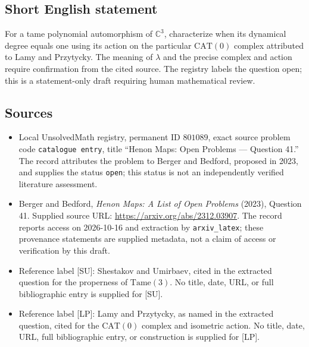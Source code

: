 \documentclass[11pt]{article}
\newcommand{\C}{\mathbb{C}}
\begin{document}
\subsection{Short English statement}
For a tame polynomial automorphism of \(\C^3\), characterize when its dynamical degree equals one using its action on the particular \(\mathrm{CAT}(0)\) complex attributed to Lamy and Przytycky. The meaning of \(\lambda\) and the precise complex and action require confirmation from the cited source. The registry labels the question open; this is a statement-only draft requiring human mathematical review.
\subsection{Sources}
\begin{itemize}
\item Local UnsolvedMath registry, permanent ID \(801089\), exact source problem code \texttt{catalogue entry}, title ``Henon Maps: Open Problems --- Question 41.'' The record attributes the problem to Berger and Bedford, proposed in 2023, and supplies the status \texttt{open}; this status is not an independently verified literature assessment.
\item Berger and Bedford, \emph{Henon Maps: A List of Open Problems} (2023), Question 41. Supplied source URL: \url{https://arxiv.org/abs/2312.03907}. The record reports access on 2026-10-16 and extraction by \texttt{arxiv\_latex}; these provenance statements are supplied metadata, not a claim of access or verification by this draft.
\item Reference label [SU]: Shestakov and Umirbaev, cited in the extracted question for the properness of \(\mathrm{Tame}(3)\). No title, date, URL, or full bibliographic entry is supplied for [SU].
\item Reference label [LP]: Lamy and Przytycky, as named in the extracted question, cited for the \(\mathrm{CAT}(0)\) complex and isometric action. No title, date, URL, full bibliographic entry, or construction is supplied for [LP].
\end{itemize}
\end{document}
